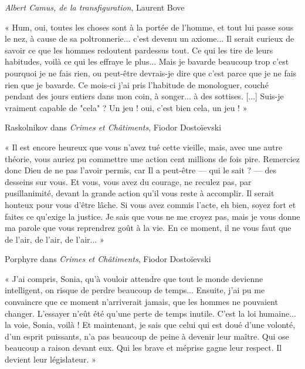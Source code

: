 \documentclass{article}
\begin{document}
\begin{flushright}\textit{Albert Camus, de la transfiguration}, Laurent Bove\end{flushright}
\vspace{8pt}
\begin{center} « Hum, oui, toutes les choses sont à la portée de l'homme, et tout lui passe sous le nez, à cause de sa poltronnerie... c'est devenu un axiome... Il serait curieux de savoir ce que les hommes redoutent pardessus tout. Ce qui les tire de leurs habitudes, voilà ce qui les effraye le plus... Mais je bavarde beaucoup trop c'est pourquoi je ne fais rien, ou peut-être devrais-je dire que c'est parce que je ne fais rien que je bavarde. Ce mois-ci j'ai pris l'habitude de monologuer, couché pendant des jours entiers dans mon coin, à songer... à des sottises. [...] Suis-je vraiment capable de "cela" ? Un jeu ! oui, c'est bien cela, un jeu ! » \end{center}

\begin{flushright}Raskolnikov dans \textit{Crimes et Châtiments}, Fiodor Dostoïevski\end{flushright}
\vspace{8pt}
\begin{center} « Il est encore heureux que vous n'avez tué cette vieille, mais, avec une autre théorie, vous auriez pu commettre une action cent millions de fois pire. Remerciez donc Dieu de ne pas l'avoir permis, car Il a peut-être — qui le sait ? — des desseins sur vous. Et vous, vous avez du courage, ne reculez pas, par pusillanimité, devant la grande action qu'il vous reste à accomplir. Il serait honteux pour vous d'être lâche. Si vous avez commis l'acte, eh bien, soyez fort et faites ce qu'exige la justice. Je sais que vous ne me croyez pas, mais je vous donne ma parole que vous reprendrez goût à la vie. En ce moment, il ne vous faut que de l'air, de l'air, de l'air... » \end{center}

\begin{flushright}Porphyre dans \textit{Crimes et Châtiments}, Fiodor Dostoïevski\end{flushright}
\vspace{8pt}
\begin{center} « J'ai compris, Sonia, qu'à vouloir attendre que tout le monde devienne intelligent, on risque de perdre beaucoup de temps... Ensuite, j'ai pu me convaincre que ce moment n'arriverait jamais, que les hommes ne pouvaient changer. L'essayer n'eût été qu'une perte de temps inutile. C'est la loi humaine... la voie, Sonia, voilà ! Et maintenant, je sais que celui qui est doué d'une volonté, d'un esprit puissants, n'a pas beaucoup de peine à devenir leur maître. Qui ose beaucoup a raison devant eux. Qui les brave et méprise gagne leur respect. Il devient leur législateur. » \end{center}
\end{document}
